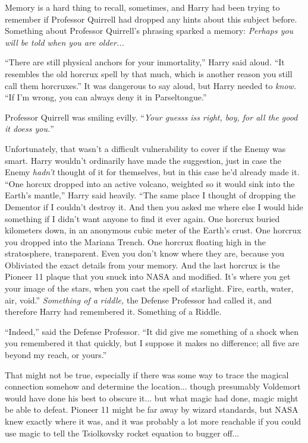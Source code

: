 Memory is a hard thing to recall, sometimes, and Harry had been trying to remember if Professor Quirrell had dropped any hints about this subject before. Something about Professor Quirrell's phrasing sparked a memory: \emph{Perhaps you will be told when you are older...}

``There are still physical anchors for your immortality,'' Harry said aloud. ``It resembles the old horcrux spell by that much, which is another reason you still call them horcruxes.'' It was dangerous to say aloud, but Harry needed to \emph{know.} ``If I'm wrong, you can always deny it in Parseltongue.''

Professor Quirrell was smiling evilly. ``\emph{Your guesss iss right, boy, for all the good it doess you.}''

Unfortunately, that wasn't a difficult vulnerability to cover if the Enemy was smart. Harry wouldn't ordinarily have made the suggestion, just in case the Enemy \emph{hadn't} thought of it for themselves, but in this case he'd already made it. ``One horcux dropped into an active volcano, weighted so it would sink into the Earth's mantle,'' Harry said heavily. ``The same place I thought of dropping the Dementor if I couldn't destroy it. And then you asked me where else I would hide something if I didn't want anyone to find it ever again. One horcrux buried kilometers down, in an anonymous cubic meter of the Earth's crust. One horcrux you dropped into the Mariana Trench. One horcrux floating high in the stratosphere, transparent. Even you don't know where they are, because you Obliviated the exact details from your memory. And the last horcrux is the Pioneer 11 plaque that you snuck into NASA and modified. It's where you get your image of the stars, when you cast the spell of starlight. Fire, earth, water, air, void.'' \emph{Something of a riddle,} the Defense Professor had called it, and therefore Harry had remembered it. Something of a Riddle.

``Indeed,'' said the Defense Professor. ``It did give me something of a shock when you remembered it that quickly, but I suppose it makes no difference; all five are beyond my reach, or yours.''

That might not be true, especially if there was some way to trace the magical connection somehow and determine the location... though presumably Voldemort would have done his best to obscure it... but what magic had done, magic might be able to defeat. Pioneer 11 might be far away by wizard standards, but NASA knew exactly where it was, and it was probably a lot more reachable if you could use magic to tell the Tsiolkovsky rocket equation to bugger off...

